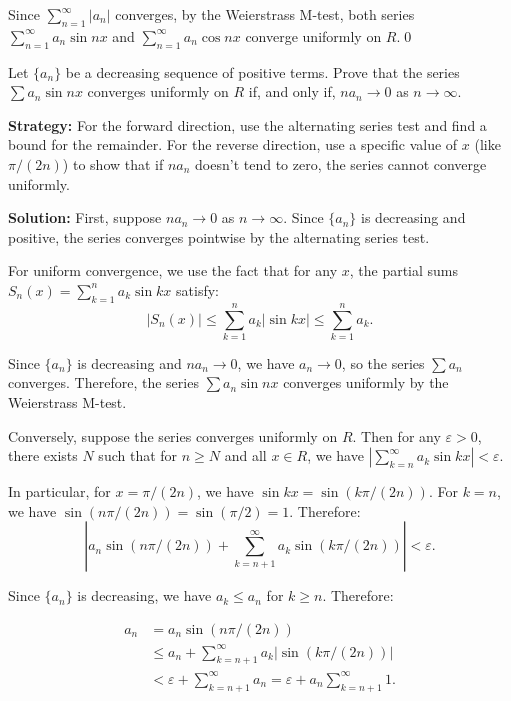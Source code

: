 Since \( \sum_{n=1}^{\infty} |a_n| \) converges, by the Weierstrass M-test, both series \( \sum_{n=1}^{\infty} a_n \sin nx \) and \( \sum_{n=1}^{\infty} a_n \cos nx \) converge uniformly on \( R \).\qed


\begin{problembox}
Let \(\{a_n\}\) be a decreasing sequence of positive terms. Prove that the series \(\sum a_n \sin nx \) converges uniformly on \( R \) if, and only if, \( na_n \to 0 \) as \( n \to \infty \).
\end{problembox}

\noindent\textbf{Strategy:} For the forward direction, use the alternating series test and find a bound for the remainder. For the reverse direction, use a specific value of \( x \) (like \( \pi/(2n) \)) to show that if \( na_n \) doesn't tend to zero, the series cannot converge uniformly.

\bigskip\noindent\textbf{Solution:} First, suppose \( na_n \to 0 \) as \( n \to \infty \). Since \( \{a_n\} \) is decreasing and positive, the series converges pointwise by the alternating series test.

For uniform convergence, we use the fact that for any \( x \), the partial sums \( S_n(x) = \sum_{k=1}^n a_k \sin kx \) satisfy:
\[|S_n(x)| \leq \sum_{k=1}^n a_k |\sin kx| \leq \sum_{k=1}^n a_k.\]

Since \( \{a_n\} \) is decreasing and \( na_n \to 0 \), we have \( a_n \to 0 \), so the series \( \sum a_n \) converges. Therefore, the series \( \sum a_n \sin nx \) converges uniformly by the Weierstrass M-test.

Conversely, suppose the series converges uniformly on \( R \). Then for any \( \varepsilon > 0 \), there exists \( N \) such that for \( n \geq N \) and all \( x \in R \), we have \( |\sum_{k=n}^{\infty} a_k \sin kx| < \varepsilon \).

In particular, for \( x = \pi/(2n) \), we have \( \sin kx = \sin(k\pi/(2n)) \). For \( k = n \), we have \( \sin(n\pi/(2n)) = \sin(\pi/2) = 1 \). Therefore:
\[|a_n \sin(n\pi/(2n)) + \sum_{k=n+1}^{\infty} a_k \sin(k\pi/(2n))| < \varepsilon.\]

Since \( \{a_n\} \) is decreasing, we have \( a_k \leq a_n \) for \( k \geq n \). Therefore:

\begin{align*}
a_n &= a_n \sin(n\pi/(2n)) \\ 
&\leq a_n + \sum_{k=n+1}^{\infty} a_k |\sin(k\pi/(2n))| \\ 
&< \varepsilon + \sum_{k=n+1}^{\infty} a_n = \varepsilon + a_n \sum_{k=n+1}^{\infty} 1.
\end{align*}


